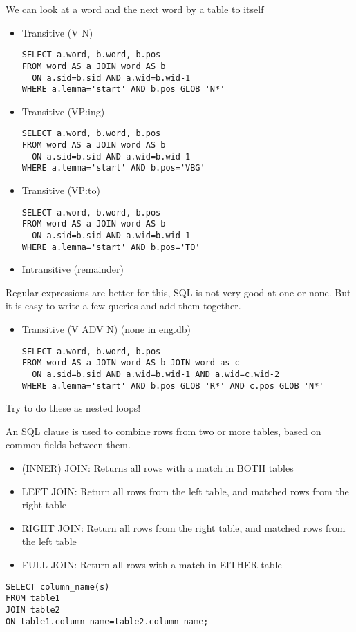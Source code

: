 \documentclass[a4paper,landscape,headrule,footrule,xetex]{foils}
\begin{document}

We can look at a word and the next word by  a table to itself

\begin{itemize}
\item Transitive (V N) 
\begin{verbatim}
SELECT a.word, b.word, b.pos
FROM word AS a JOIN word AS b 
  ON a.sid=b.sid AND a.wid=b.wid-1
WHERE a.lemma='start' AND b.pos GLOB 'N*'
\end{verbatim}
\item Transitive (VP:ing)
\begin{verbatim}
SELECT a.word, b.word, b.pos
FROM word AS a JOIN word AS b 
  ON a.sid=b.sid AND a.wid=b.wid-1
WHERE a.lemma='start' AND b.pos='VBG'
\end{verbatim}
\newpage
\item Transitive (VP:to)
\begin{verbatim}
SELECT a.word, b.word, b.pos
FROM word AS a JOIN word AS b 
  ON a.sid=b.sid AND a.wid=b.wid-1
WHERE a.lemma='start' AND b.pos='TO'
\end{verbatim}
\item Intransitive (remainder)
\end{itemize}

Regular expressions are better for this, SQL is not very good at one
or none.  But it is easy to write a few queries and add them together.
\newpage
\begin{itemize}
\item Transitive (V ADV N) (none in eng.db)
\begin{verbatim}
SELECT a.word, b.word, b.pos
FROM word AS a JOIN word AS b JOIN word as c
  ON a.sid=b.sid AND a.wid=b.wid-1 AND a.wid=c.wid-2
WHERE a.lemma='start' AND b.pos GLOB 'R*' AND c.pos GLOB 'N*'
\end{verbatim}
\end{itemize}

Try to do these as nested loops!



An SQL  clause is used to combine rows from two or more
tables, based on common fields between them.

\begin{itemize}\addtolength{\itemsep}{-1ex}
\item (INNER) JOIN: Returns all rows with a  match in BOTH tables
\item LEFT JOIN: Return all rows from the left table, and matched rows from the right table
\item RIGHT JOIN: Return all rows from the right table, and matched rows from the left table
\item FULL JOIN: Return all rows with a match in EITHER table
\end{itemize}
\begin{verbatim}
SELECT column_name(s)
FROM table1
JOIN table2
ON table1.column_name=table2.column_name;
\end{verbatim}
\end{document}
